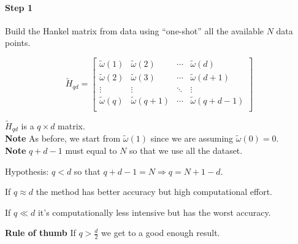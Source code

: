
\paragraph{Step 1} Build the Hankel matrix from data using ``one-shot'' all the available $N$ data points.

\[
    \tilde{H}_{qd} = \begin{bmatrix}
        \tilde{\omega}(1) & \tilde{\omega}(2) & \cdots & \tilde{\omega}(d) \\
        \tilde{\omega}(2) & \tilde{\omega}(3) & \cdots & \tilde{\omega}(d+1) \\
        \vdots            & \vdots            & \ddots & \vdots \\
        \tilde{\omega}(q) & \tilde{\omega}(q+1) & \cdots & \tilde{\omega}(q+d-1) \\
    \end{bmatrix}
\]

$\tilde{H}_{qd}$ is a $q\times d$ matrix.\\
\textbf{Note} As before, we start from $\tilde{\omega}(1)$ since we are assuming $\tilde{\omega}(0)=0$. \\
\textbf{Note} $q+d-1$ must equal to $N$ so that we use all the dataset.


\begin{rem}
    Hypothesis: $q<d$ so that $q+d-1=N \Rightarrow q=N+1-d$.
    \begin{figure}[H]
        \centering
    \end{figure}

    If $q \approx d$ the method has better accuracy but high computational effort.
    
    If $q \ll d$ it's computationally less intensive but has the worst accuracy.

    \textbf{Rule of thumb} If $ q > \frac{d}{2}$ we get to a good enough result.
\end{rem}

